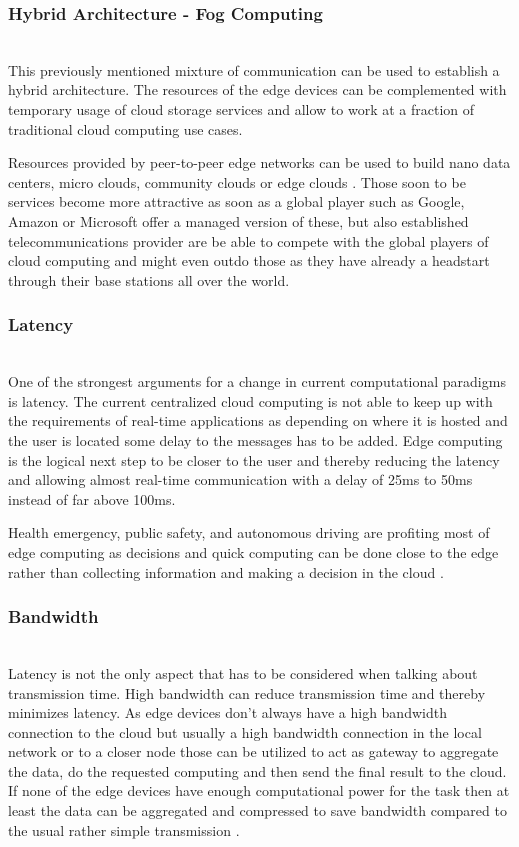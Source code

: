 \subsubsection{Hybrid Architecture - Fog Computing}\hspace*{\fill} \\
This previously mentioned mixture of communication can be used to establish a hybrid architecture. The resources of the edge devices can be complemented with temporary usage of cloud storage services \cite{GarciaLopez:2015:ECV:2831347.2831354} and allow to work at a fraction of traditional cloud computing use cases.

Resources provided by peer-to-peer edge networks can be used to build nano data centers, micro clouds, community clouds or edge clouds \cite{GarciaLopez:2015:ECV:2831347.2831354}. Those soon to be services become more attractive as soon as a global player such as Google, Amazon or Microsoft offer a managed version of these, but also established telecommunications provider are be able to compete with the global players of cloud computing and might even outdo those as they have already a headstart through their base stations all over the world.

\subsubsection{Latency}\hspace*{\fill} \\
One of the strongest arguments for a change in current computational paradigms is latency. The current centralized cloud computing is not able to keep up with the requirements of real-time applications as depending on where it is hosted and the user is located some delay to the messages has to be added.
Edge computing is the logical next step to be closer to the user and thereby reducing the latency and allowing almost real-time communication with a delay of 25ms to 50ms instead of far above 100ms.

Health emergency, public safety, and autonomous driving are profiting most of edge computing as decisions and quick computing can be done close to the edge rather than collecting information and making a decision in the cloud \cite{7488250}.

\subsubsection{Bandwidth}\hspace*{\fill} \\
Latency is not the only aspect that has to be considered when talking about transmission time. High bandwidth can reduce transmission time and thereby minimizes latency.
As edge devices don’t always have a high bandwidth connection to the cloud but usually a high bandwidth connection in the local network or to a closer node those can be utilized to act as gateway to aggregate the data, do the requested computing and then send the final result to the cloud. If none of the edge devices have enough computational power for the task then at least the data can be aggregated and compressed to save bandwidth compared to the usual rather simple transmission \cite{7488250}.

